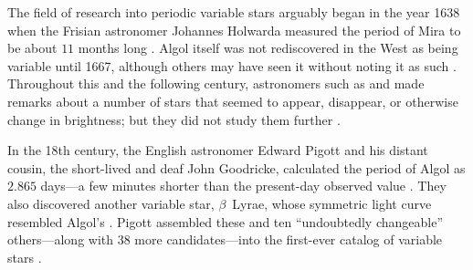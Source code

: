 The field of research into periodic variable stars arguably began in the year 1638 when the Frisian astronomer Johannes Holwarda measured the period of Mira to be about $11$ months long \citep[e.g.,][]{1997JAVSO..25..115H}. 
Algol itself was not rediscovered in the West as being variable until 1667, although others may have seen it without noting it as such \citep[e.g.,][]{bolt2007biographical}. 
Throughout this and the following century, astronomers such as \citet{10.2307/101080} and \citet{flamsteed} made remarks about a number of stars that seemed to appear, disappear, or otherwise change in brightness; but they did not study them further \citep[e.g.,][]{10.2307/106621}. 

In the 18th century, the English astronomer Edward Pigott and his distant cousin, the short-lived and deaf John Goodricke, calculated the period of Algol as $2.865$ days---a few minutes shorter than the present-day observed value \citep{10.2307/106502,10.2307/106591,2012ApJ...752...20B}. 
They also discovered another variable star, $\beta$~Lyrae, whose symmetric light curve resembled Algol's \citep{1785RSPT...75..127P}. 
Pigott assembled these and ten ``undoubtedly changeable'' others---along with $38$ more candidates---into the first-ever catalog of variable stars \citep{10.2307/106621}. 

